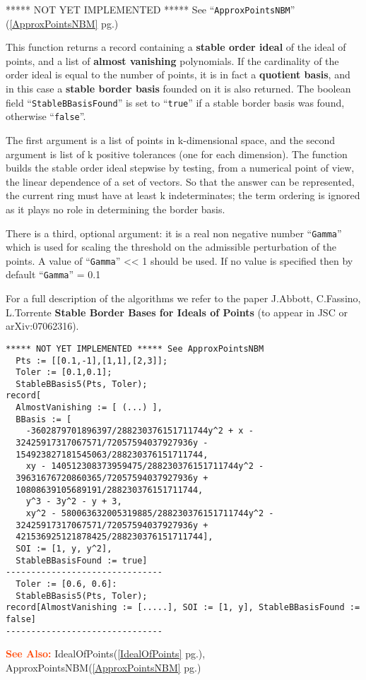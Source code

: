 \documentclass[a4paper]{mybook}
\newenvironment{command}{}{} %
\newcommand\SeeAlso{\par\textcolor{OrangeRed}{\textbf{\large See Also: }}}
\begin{document}
\begin{command}
***** NOT YET IMPLEMENTED *****
See ``\verb&ApproxPointsNBM&'' (\ref{ApproxPointsNBM} pg.\pageref{ApproxPointsNBM})
\par 
This function returns a record containing a \textbf{stable order ideal} of
the ideal of points, and a list of \textbf{almost vanishing} polynomials.
If the cardinality of the order ideal is equal to the number of points,
it is in fact a \textbf{quotient basis}, and in this case a
\textbf{stable border basis} founded on it is also returned.  The boolean field
``\verb&StableBBasisFound&'' is set to ``\verb&true&'' if a stable border basis was found,
otherwise ``\verb&false&''.
\par 
The first argument is a list of points in k-dimensional space, and the
second argument is list of k positive tolerances (one for each dimension).
The function builds the stable order ideal stepwise by testing, from a
numerical point of view, the linear dependence of a set of vectors.
So that the answer can be represented, the current ring must have at
least k indeterminates; the term ordering is ignored as it plays no role
in determining the border basis.
 \par 
 There is a third, optional argument: it is a real non negative number
 ``\verb&Gamma&'' which is used for scaling the threshold on the
 admissible perturbation of the points.
 A value of ``\verb&Gamma&'' << 1 should be used.
 If no value is specified then by default ``\verb&Gamma&'' = 0.1
 \par 
 For a full description of the algorithms we refer to the paper
 J.Abbott, C.Fassino, L.Torrente
 \textbf{Stable Border Bases for Ideals of Points} (to appear in JSC
 or arXiv:07062316).
 \par 
\begin{Verbatim}[label=example, rulecolor=\color{PineGreen}, frame=single]
***** NOT YET IMPLEMENTED ***** See ApproxPointsNBM
  Pts := [[0.1,-1],[1,1],[2,3]];
  Toler := [0.1,0.1];
  StableBBasis5(Pts, Toler);
record[
  AlmostVanishing := [ (...) ],
  BBasis := [
    -3602879701896397/288230376151711744y^2 + x -
  32425917317067571/72057594037927936y -
  154923827181545063/288230376151711744,
    xy - 140512308373959475/288230376151711744y^2 -
  39631676720860365/72057594037927936y +
  10808639105689191/288230376151711744,
    y^3 - 3y^2 - y + 3,
    xy^2 - 580063632005319885/288230376151711744y^2 -
  32425917317067571/72057594037927936y +
  421536925121878425/288230376151711744],
  SOI := [1, y, y^2],
  StableBBasisFound := true]
-------------------------------
  Toler := [0.6, 0.6]:
  StableBBasis5(Pts, Toler);
record[AlmostVanishing := [.....], SOI := [1, y], StableBBasisFound := false]
-------------------------------
\end{Verbatim}


\SeeAlso %
  IdealOfPoints(\ref{IdealOfPoints} pg.\pageref{IdealOfPoints}), 
    ApproxPointsNBM(\ref{ApproxPointsNBM} pg.\pageref{ApproxPointsNBM})
\end{command} %
\end{document}
